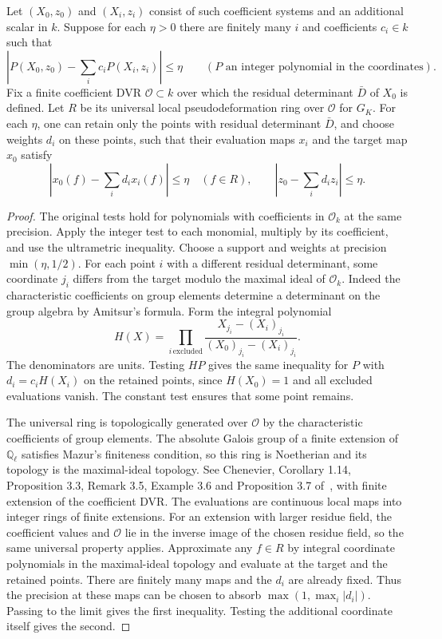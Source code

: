 \begin{lemma}\label{addg:residual}
Let \((X_0,z_0)\) and \((X_i,z_i)\) consist of such coefficient systems
and an additional scalar in \(k\). Suppose for each \(\eta>0\) there
are finitely many \(i\) and coefficients \(c_i\in k\) such that
\[
 \left|P(X_0,z_0)-\sum_i c_iP(X_i,z_i)\right|\le\eta
 \qquad(P\text{ an integer polynomial in the coordinates}).
\]
Fix a finite coefficient DVR \(\mathcal O\subset k\) over which the
residual determinant \(\bar D\) of \(X_0\) is defined. Let \(R\) be
its universal local pseudodeformation ring over \(\mathcal O\) for
\(G_K\). For each \(\eta\), one can retain only the points with residual
determinant \(\bar D\), and choose weights \(d_i\) on these points,
such that their evaluation maps \(x_i\) and the target map \(x_0\) satisfy
\[
  \left|x_0(f)-\sum_i d_i x_i(f)\right|\le\eta\quad(f\in R),
  \qquad \left|z_0-\sum_i d_i z_i\right|\le\eta .
\]
\end{lemma}
\begin{proof}
The original tests hold for polynomials with coefficients in
\(\mathcal O_k\) at the same precision. Apply the integer test to each
monomial, multiply by its coefficient, and use the ultrametric inequality.
Choose a support and weights at precision \(\min(\eta,1/2)\).
For each point \(i\) with a
different residual determinant, some coordinate \(j_i\) differs from the
target modulo the maximal ideal of \(\mathcal O_k\). Indeed the
characteristic coefficients on group elements determine a determinant on
the group algebra by Amitsur's formula. Form the integral polynomial
\[
 H(X)=\prod_{i\,\mathrm{excluded}}
       \frac{X_{j_i}-(X_i)_{j_i}}{(X_0)_{j_i}-(X_i)_{j_i}} .
\]
The denominators are units. Testing \(HP\) gives the same inequality
for \(P\) with \(d_i=c_iH(X_i)\) on the retained points, since
\(H(X_0)=1\) and all excluded evaluations vanish. The constant test
ensures that some point remains.

The universal ring is topologically generated over \(\mathcal O\) by
the characteristic coefficients of group elements. The absolute Galois
group of a finite extension of \(\mathbb Q_\ell\) satisfies Mazur's
finiteness condition, so this ring is Noetherian and its topology is
the maximal-ideal topology. See Chenevier, Corollary 1.14,
Proposition 3.3, Remark 3.5, Example 3.6 and Proposition 3.7
of~\cite{chenevier}, with finite extension of the coefficient DVR.
The evaluations are continuous local maps into integer rings of finite
extensions. For an extension with larger residue field, the coefficient
values and \(\mathcal O\) lie in the inverse image of the chosen residue
field, so the same universal property applies. Approximate any \(f\in R\)
by integral coordinate polynomials in the maximal-ideal topology and
evaluate at the target and the retained points. There are finitely many
maps and the \(d_i\) are already fixed. Thus the precision at these maps
can be chosen to absorb \(\max(1,\max_i|d_i|)\). Passing to the limit
gives the first inequality. Testing the additional coordinate itself
gives the second.
\end{proof}

